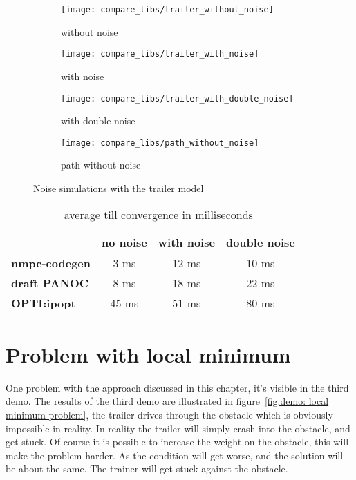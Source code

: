 \begin{figure}[H]
	\centering
	\begin{subfigure}[b]{0.45\textwidth}
		\centering
		\texttt{[image: compare\_libs/trailer\_without\_noise]}
		\caption{without noise}
		\label{fig:timings trailer without noise}
	\end{subfigure}
	\hfill
	\begin{subfigure}[b]{0.45\textwidth}
		\centering
		\texttt{[image: compare\_libs/trailer\_with\_noise]}
		\caption{with noise}
		\label{fig:timings trailer with noise}
	\end{subfigure}
	\begin{subfigure}[b]{0.45\textwidth}
		\centering
		\texttt{[image: compare\_libs/trailer\_with\_double\_noise]}
		\caption{with double noise}
		\label{fig:timings trailer with double noise}
	\end{subfigure}
	\hfill
	\begin{subfigure}[b]{0.45\textwidth}
		\centering
		\texttt{[image: compare\_libs/path\_without\_noise]}
		\caption{path without noise}
		\label{fig:path noise simulations}
	\end{subfigure}
	\caption{Noise simulations with the trailer model}
	\label{fig:Noise simulations with the trailer model}
\end{figure}

\begin{table}[H]
	\centering
	\begin{tabular}{|l|c|c|c|c|}
		\hline
		&\textbf{no noise}&\textbf{with noise}&\textbf{double noise}\\\hline
		\textbf{nmpc-codegen}&3 ms&12 ms&10 ms \\\hline
		\textbf{draft PANOC}&8 ms&18 ms&22 ms \\\hline
		\textbf{OPTI:ipopt}&45 ms&51 ms&80 ms \\\hline
	\end{tabular}
	\caption{average till convergence in milliseconds}
	\label{tbl:average till convergence noise}
\end{table}

\section{Problem with local minimum}
One problem with the approach discussed in this chapter, it's visible in the third demo. The results of the third demo are illustrated in figure~\ref{fig:demo: local minimum problem}, the trailer drives through the obstacle which is obviously impossible in reality. In reality the trailer will simply crash into the obstacle, and get stuck. Of course it is possible to increase the weight on the obstacle, this will make the problem harder. As the condition will get worse, and the solution will be about the same. The trainer will get stuck against the obstacle.

